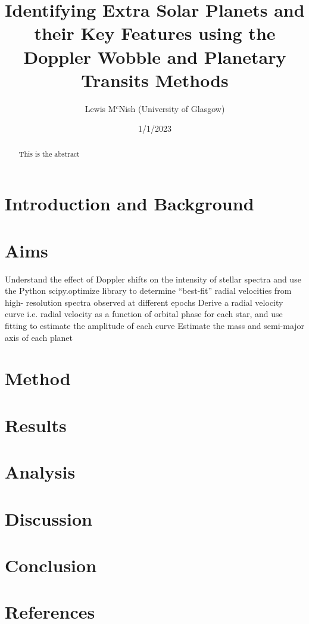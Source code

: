\documentclass[]{article}
\title{\textbf{Identifying Extra Solar Planets and their Key Features using the Doppler Wobble and Planetary Transits Methods}}
\author{Lewis M$^{c}$Nish (University of Glasgow)}
\date{1/1/2023}
\begin{document}
\maketitle

\begin{abstract}
This is the abstract

\end{abstract}
\newpage



\twocolumn
\section*{Introduction and Background}

\section*{Aims}
Understand the effect of Doppler shifts on the intensity of stellar spectra and use the Python scipy.optimize library to determine “best-fit” radial velocities from high- resolution spectra observed at different epochs
Derive a radial velocity curve i.e. radial velocity as a function of orbital phase for each star, and use fitting to estimate the amplitude of each curve 
Estimate the mass and semi-major axis of each planet

\section*{Method}

\section*{Results}

\section*{Analysis}
\section*{Discussion}

\section*{Conclusion}

\section*{References}
\end{document}

